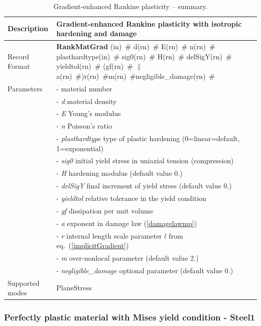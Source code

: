 \documentclass[a4paper]{article}
\newcommand{\descitem}[1]{{\noindent \bf #1}}
\newcommand{\elemparam}[2]{{{#1\tiny (#2)}~\#}}
\newcommand{\param}[1]{{\it #1}}
\begin{document}
\begin{table}[!htb]
\begin{tabular}{|l|p{9cm}|}
\hline
Description & Gradient-enhanced Rankine plasticity with isotropic hardening and damage\\
\hline
Record Format & \descitem{RankMatGrad}  \elemparam{}{in}
\elemparam{d}{rn} \elemparam{E}{rn} \elemparam{n}{rn} \elemparam{plasthardtype}{in} \elemparam{sig0}{rn} \elemparam{H}{rn} \elemparam{delSigY}{rn} \elemparam{yieldtol}{rn} (\elemparam{gf}{rn} $\|$ \elemparam{a}{rn})\elemparam{r}{rn}\elemparam{m}{rn}\elemparam{negligible\_damage}{rn}\\
Parameters &- \param{} material number\\
&- \param{d} material density\\
&- \param{E} Young's modulus\\
&- \param{n} Poisson's ratio\\
&- \param{plasthardtype} type of plastic hardening (0=linear=default, 1=exponential)\\
&- \param{sig0} initial yield stress in uniaxial tension (compression)\\
&- \param{H} hardening modulus (default value 0.)\\
&- \param{delSigY} final increment of yield stress (default value 0.)\\
&- \param{yieldtol} relative tolerance in the yield condition\\
&- \param{gf} dissipation per unit volume\\
&- \param{a} exponent in damage law (\ref{damagelawmp})\\
&- \param{r} internal length scale parameter $l$ from eq.~(\ref{implicitGradient})\\
&- \param{m} over-nonlocal parameter (default value 2.)\\
&- \param{negligible\_damage} optional parameter (default value 0.)\\
Supported modes& PlaneStress\\
\hline
\end{tabular}
\caption{Gradient-enhanced Rankine plasticity -- summary.}
\label{rankineMatGrad_table}
\end{table}

\subsubsection{Perfectly plastic material with Mises yield condition - Steel1}
\end{document}
